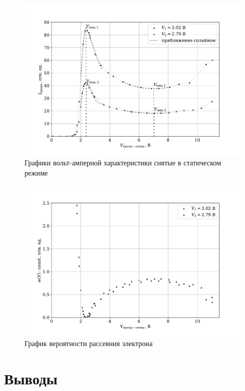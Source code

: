 \documentclass[a4paper,12pt]{article} %
\begin{document}
\begin{figure}
\centering
\includegraphics[width=\textwidth]{plot.pdf}
\caption{Графики вольт-амперной характеристики снятые в статическом режиме}
\label{fig:static}
\end{figure}

\begin{figure}
\centering
\includegraphics[width=\textwidth]{plot_prob.pdf}
\caption{График вероятности рассеяния электрона}
\label{fig:static_prob}
\end{figure}

\section{Выводы}
\end{document}
